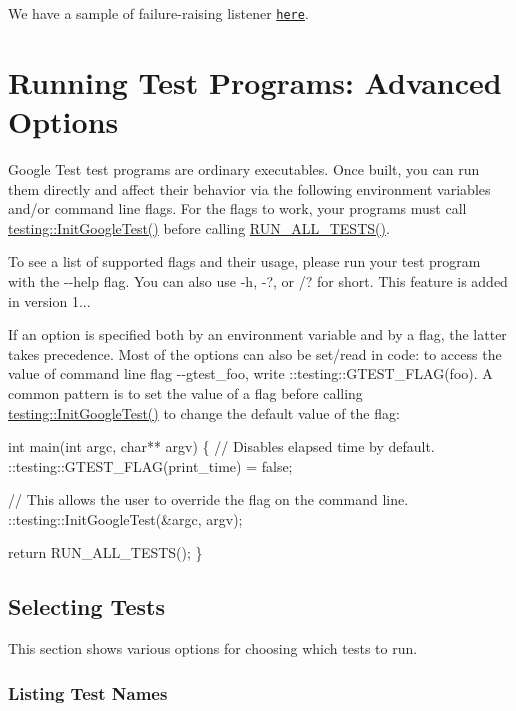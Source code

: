 We have a sample of failure-\/raising listener \href{../samples/sample10_unittest.cc}{\tt here}.

\section*{Running Test Programs\+: Advanced Options}

Google Test test programs are ordinary executables. Once built, you can run them directly and affect their behavior via the following environment variables and/or command line flags. For the flags to work, your programs must call {\ttfamily \hyperlink{namespacetesting_afd726ae08c9bd16dc52f78c822d9946b}{testing\+::\+Init\+Google\+Test()}} before calling {\ttfamily \hyperlink{gtest_8h_a853a3792807489591d3d4a2f2ff9359f}{R\+U\+N\+\_\+\+A\+L\+L\+\_\+\+T\+E\+S\+T\+S()}}.

To see a list of supported flags and their usage, please run your test program with the {\ttfamily -\/-\/help} flag. You can also use {\ttfamily -\/h}, {\ttfamily -\/?}, or {\ttfamily /?} for short. This feature is added in version 1...

If an option is specified both by an environment variable and by a flag, the latter takes precedence. Most of the options can also be set/read in code\+: to access the value of command line flag {\ttfamily -\/-\/gtest\+\_\+foo}, write {\ttfamily \+::testing\+::\+G\+T\+E\+S\+T\+\_\+\+F\+L\+A\+G(foo)}. A common pattern is to set the value of a flag before calling {\ttfamily \hyperlink{namespacetesting_afd726ae08c9bd16dc52f78c822d9946b}{testing\+::\+Init\+Google\+Test()}} to change the default value of the flag\+: 
\begin{DoxyCode}
int main(int argc, char** argv) \{
  // Disables elapsed time by default.
  ::testing::GTEST\_FLAG(print\_time) = false;

  // This allows the user to override the flag on the command line.
  ::testing::InitGoogleTest(&argc, argv);

  return RUN\_ALL\_TESTS();
\}
\end{DoxyCode}


\subsection*{Selecting Tests}

This section shows various options for choosing which tests to run.

\subsubsection*{Listing Test Names}

